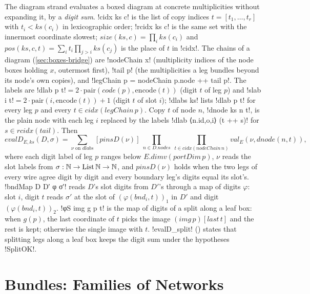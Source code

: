 {The diagram strand evaluates a boxed diagram at concrete multiplicities without expanding it, by a \emph{digit sum}. \lbx!cidx ks c! is the list of copy indices $t=[t_1,\dots,t_r]$ with $t_i<\mathit{ks}(c_i)$ in lexicographic order; \lbx!rcidx ks c! is the same set with the innermost coordinate slowest; $\mathit{size}(\mathit{ks},c)=\prod_i \mathit{ks}(c_i)$ and $\mathit{pos}(\mathit{ks},c,t)=\sum_i t_i\prod_{j>i}\mathit{ks}(c_j)$ is the place of $t$ in \lbx!cidx!. The chains of a diagram (\cref{sec:boxes-bridge}) are \lbx!nodeChain x! (multiplicity indices of the node boxes holding $x$, outermost first), \lbx!tail p! (the multiplicities a leg bundles beyond its node's own copies), and \lbx!legChain p = nodeChain p.node ++ tail p!. The labels are \lbx!dlab p t!$=2\cdot\mathrm{pair}(\mathit{code}(p),\mathrm{encode}(t))$ (digit $t$ of leg $p$) and \lbx!slab i t!$=2\cdot\mathrm{pair}(i,\mathrm{encode}(t))+1$ (digit $t$ of slot $i$); \lbx!dlabs ks! lists \lbx!dlab p t! for every leg $p$ and every $t\in\mathit{cidx}(\mathit{legChain}\,p)$. Copy $t$ of node $n$, \lbx!dnode ks n t!, is the plain node with each leg $i$ replaced by the labels \lbx!dlab ⟨n.id,o,i⟩ (t ++ s)! for $s\in\mathit{rcidx}(\mathit{tail})$. Then
\begin{equation}\label{eq:boxes-evalD}
\mathit{evalD}_{E,\mathit{ks}}(D,\sigma)=\sum_{\nu\text{ on } \mathit{dlabs}}[\mathit{pinsD}(\nu)]\ \prod_{n\in D.\mathit{nodes}}\ \prod_{t\in\mathit{cidx}(\mathit{nodeChain}\,n)}\mathit{val}_E(\nu,\mathit{dnode}(n,t)),
\end{equation}
where each digit label of leg $p$ ranges below $E.\mathit{dimv}(\mathit{portDim}\,p)$, $\nu$ reads the slot labels from $\sigma:\mathbb{N}\to\mathrm{List}\,\mathbb{N}\to\mathbb{N}$, and $\mathit{pinsD}(\nu)$ holds when the two legs of every wire agree digit by digit and every boundary leg's digits equal its slot's. \lbx!bndMap D D′ φ σ′! reads $D$'s slot digits from $D'$'s through a map of digits $\varphi$: slot $i$, digit $t$ reads $\sigma'$ at the slot of $(\varphi(\mathit{bnd}_i,t))_1$ in $D'$ and digit $(\varphi(\mathit{bnd}_i,t))_2$. \lbx!φS img g p t! is the map of digits of a split along a leaf box: when $g(p)$, the last coordinate of $t$ picks the image $(\mathit{img}\,p)[\mathit{last}\,t]$ and the rest is kept; otherwise the single image with $t$. \lbx!evalD_split! () states that splitting legs along a leaf box keeps the digit sum under the hypotheses \lbx!SplitOK!.

\section{Bundles: Families of Networks}\label{sec:boxes-bundle}

}
